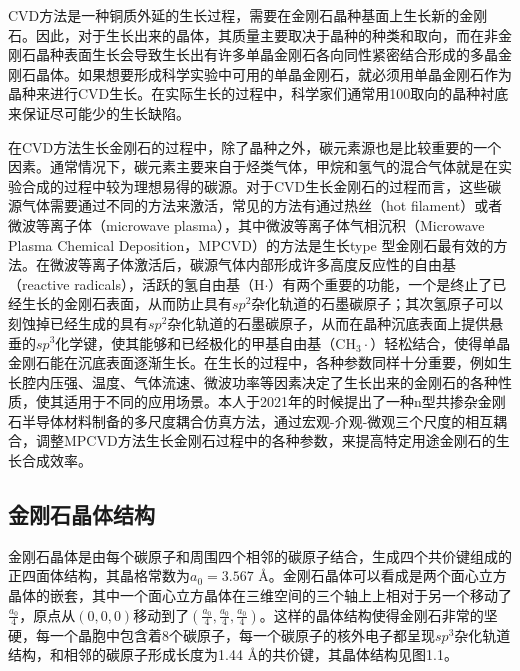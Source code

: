 \documentclass[type = bachelor]{whu-thesis}
\begin{document}
CVD方法是一种铜质外延的生长过程，需要在金刚石晶种基面上生长新的金刚石\cite{isberg2002high,isberg2002high}。因此，对于生长出来的晶体，其质量主要取决于晶种的种类和取向，而在非金刚石晶种表面生长会导致生长出有许多单晶金刚石各向同性紧密结合形成的多晶金刚石晶体\cite{mildren2013optical, jahnke2012long}。如果想要形成科学实验中可用的单晶金刚石，就必须用单晶金刚石作为晶种来进行CVD生长。在实际生长的过程中，科学家们通常用{100}取向的晶种衬底来保证尽可能少的生长缺陷\cite{gicquel2001cvd}。

在CVD方法生长金刚石的过程中，除了晶种之外，碳元素源也是比较重要的一个因素。通常情况下，碳元素主要来自于烃类气体，甲烷和氢气的混合气体就是在实验合成的过程中较为理想易得的碳源。对于CVD生长金刚石的过程而言，这些碳源气体需要通过不同的方法来激活，常见的方法有通过热丝（hot filament）或者微波等离子体（microwave plasma），其中微波等离子体气相沉积（Microwave Plasma Chemical Deposition，MPCVD）的方法是生长type \uppercase\expandafter{}型金刚石最有效的方法\cite{robins1990line, nemanich2014cvd}。在微波等离子体激活后，碳源气体内部形成许多高度反应性的自由基（reactive radicals），活跃的氢自由基（H$\cdot$）有两个重要的功能，一个是终止了已经生长的金刚石表面，从而防止具有$sp^2$杂化轨道的石墨碳原子；其次氢原子可以刻蚀掉已经生成的具有$sp^2$杂化轨道的石墨碳原子，从而在晶种沉底表面上提供悬垂的$sp^3$化学键，使其能够和已经极化的甲基自由基（CH$_3\cdot$）轻松结合，使得单晶金刚石能在沉底表面逐渐生长\cite{denisenko2010surface}。在生长的过程中，各种参数同样十分重要，例如生长腔内压强、温度、气体流速、微波功率等因素决定了生长出来的金刚石的各种性质，使其适用于不同的应用场景。本人于2021年的时候提出了一种n型共掺杂金刚石半导体材料制备的多尺度耦合仿真方法，通过宏观-介观-微观三个尺度的相互耦合，调整MPCVD方法生长金刚石过程中的各种参数，来提高特定用途金刚石的生长合成效率\cite{CN113096749B}。

\subsection{金刚石晶体结构}
金刚石晶体是由每个碳原子和周围四个相邻的碳原子结合，生成四个共价键组成的正四面体结构，其晶格常数为$a_0 = 3.567$ \unit{\angstrom}。金刚石晶体可以看成是两个面心立方晶体的嵌套，其中一个面心立方晶体在三维空间的三个轴上上相对于另一个移动了$\frac{a_0}{4}$，原点从$(0, 0, 0)$移动到了$(\frac{a_0}{4}, \frac{a_0}{4}, \frac{a_0}{4})$。这样的晶体结构使得金刚石非常的坚硬，每一个晶胞中包含着8个碳原子，每一个碳原子的核外电子都呈现$sp^3$杂化轨道结构，和相邻的碳原子形成长度为1.44 \unit{\angstrom}的共价键，其晶体结构见图1.1。
\end{document}
